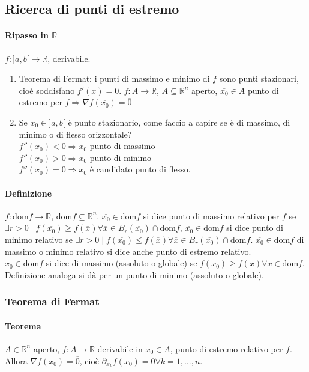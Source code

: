 \documentclass{article}
\newcommand{\R}{\mathbb{R}}
\newcommand{\dom}{\text{dom}}
\begin{document}
\subsection{{Ricerca di punti di estremo}}
\paragraph{Ripasso in $\R$}
$f:]a,b[\rightarrow \R$, derivabile.
\begin{enumerate}
    \item Teorema di Fermat: i punti di massimo e minimo di $f$ sono punti stazionari, cioè soddisfano $f'(x)=0$.
    $f: A \rightarrow \R$, $A \subseteq \R^n$ aperto, $\overline{x_0}\in A$ punto di estremo per $f \Rightarrow \nabla f(\overline{x_0})=\overline{0}$
    \item Se $x_0 \in ]a,b[$ è punto stazionario, come faccio a capire se è di massimo, di minimo o di flesso orizzontale?\\
    $f''(x_0)<0 \Rightarrow x_0$ punto di massimo\\
    $f''(x_0)>0 \Rightarrow x_0$ punto di minimo\\
    $f''(x_0)=0 \Rightarrow x_0$ è candidato punto di flesso.
\end{enumerate}

\paragraph{{Definizione}}
$f:\dom f \rightarrow \R$, $\dom f \subseteq \R^n$. $\overline{x_0}\in \dom f$ si dice punto di massimo relativo per $f$ se $\exists r >0 \mid f(\overline{x_0})\geq f(\overline{x})\forall\overline{x}\in B_r(\overline{x_0})\cap \dom f$, $\overline{x_0}\in \dom f$ si dice punto di minimo relativo se $\exists r >0 \mid f(\overline{x_0})\leq f(\overline{x})\forall \overline{x} \in B_r(\overline{x_0})\cap \dom f$. $\overline{x_0} \in \dom f$ di massimo o minimo relativo si dice anche punto di estremo relativo.\\
$\overline{x_0}\in \dom f$ si dice di massimo (assoluto o globale) se $f(\overline{x_0})\geq f(\overline{x})\forall \overline{x} \in \dom f$. Definizione analoga si dà per un punto di minimo (assoluto o globale).

\subsubsection{{Teorema di Fermat}}
\paragraph{{Teorema}}
$A \in \R^n$ aperto, $f: A \rightarrow \R$ derivabile in $\overline{x_0} \in A$, punto di estremo relativo per $f$. Allora $\nabla f(\overline{x_0})=\overline{0}$, cioè $\partial_{x_k}f(\overline{x_0})=0 \forall k =1,...,n$.
\end{document}
